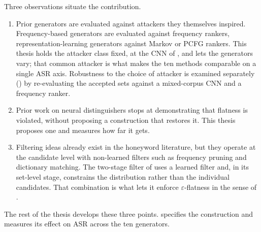 Three observations situate the contribution.
%
\begin{enumerate}
    \item Prior generators are evaluated against attackers they
    themselves inspired. Frequency-based generators are evaluated
    against frequency rankers, representation-learning generators
    against Markov or PCFG rankers. This thesis holds the attacker class
    fixed, at the CNN of \textcite{dani2024passfilter}, and lets the
    generators vary; that common attacker is what makes the ten methods
    comparable on a single ASR axis. Robustness to the choice of
    attacker is examined separately () by
    re-evaluating the accepted sets against a mixed-corpus CNN and a
    frequency ranker.

    \item Prior work on neural distinguishers stops at demonstrating
    that flatness is violated, without proposing a construction that
    restores it. This thesis proposes one and measures how far it gets.

    \item Filtering ideas already exist in the honeyword literature, but
    they operate at the candidate level with non-learned filters such as
    frequency pruning and dictionary matching. The two-stage filter of
     uses a learned filter and, in its set-level
    stage, constrains the distribution rather than the individual
    candidates. That combination is what lets it enforce
    $\varepsilon$-flatness in the sense of .
\end{enumerate}
%
The rest of the thesis develops these three points.
 specifies the construction and 
measures its effect on ASR across the ten generators.